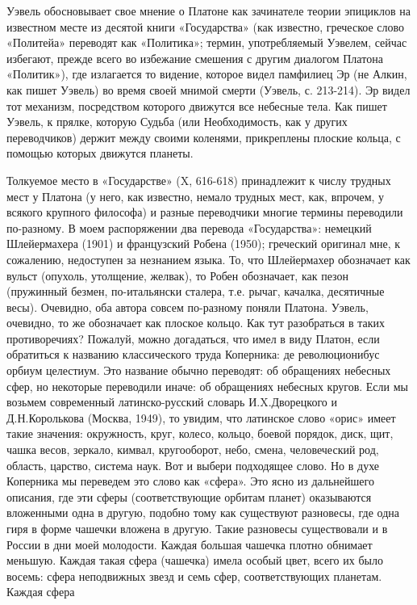 Уэвель обосновывает свое мнение о Платоне как зачинателе теории
эпициклов на известном месте из десятой книги «Государства» (как
известно, греческое слово «Политейа» переводят как «Политика»; термин,
употребляемый Уэвелем, сейчас избегают, прежде всего во избежание
смешения с другим диалогом Платона «Политик»), где излагается то
видение, которое видел памфилиец Эр (не Алкин, как пишет Уэвель) во
время своей мнимой смерти (Уэвель, с. 213-214). Эр видел тот механизм,
посредством которого движутся все небесные тела. Как пишет Уэвель, к
прялке, которую Судьба (или Необходимость, как у других переводчиков)
держит между своими коленями, прикреплены плоские кольца, с помощью
которых движутся планеты.

Толкуемое место в «Государстве» (X, 616-618) принадлежит к числу
трудных мест у Платона (у него, как известно, немало трудных мест,
как, впрочем, у всякого крупного философа) и разные переводчики многие
термины переводили по-разному. В моем распоряжении два перевода
«Государства»: немецкий Шлейермахера (1901) и французский Робена
(1950); греческий оригинал мне, к сожалению, недоступен за незнанием
языка. То, что Шлейермахер обозначает как вульст (опухоль, утолщение,
желвак), то Робен обозначает, как пезон (пружинный безмен,
по-итальянски сталера, т.е. рычаг, качалка, десятичные весы).
Очевидно, оба автора совсем по-разному поняли Платона. Уэвель,
очевидно, то же обозначает как плоское кольцо. Как тут разобраться в
таких противоречиях? Пожалуй, можно догадаться, что имел в виду
Платон, если обратиться к названию классического труда Коперника: де
революционибус орбиум целестиум. Это название обычно переводят: об
обращениях небесных сфер, но некоторые переводили иначе: об обращениях
небесных кругов. Если мы возьмем современный латинско-русский словарь
И.X.Дворецкого и Д.Н.Королькова (Москва, 1949), то увидим, что
латинское слово «орис» имеет такие значения: окружность, круг, колесо,
кольцо, боевой порядок, диск, щит, чашка весов, зеркало, кимвал,
кругооборот, небо, смена, человеческий род, область, царство, система
наук. Вот и выбери подходящее слово. Но в духе Коперника мы переведем
это слово как «сфера». Это ясно из дальнейшего описания, где эти сферы
(соответствующие орбитам планет) оказываются вложенными одна в другую,
подобно тому как существуют разновесы, где одна гиря в форме чашечки
вложена в другую. Такие разновесы существовали и в России в дни моей
молодости. Каждая большая чашечка плотно обнимает меньшую. Каждая
такая сфера (чашечка) имела особый цвет, всего их было восемь: сфера
неподвижных звезд и семь сфер, соответствующих планетам. Каждая сфера
